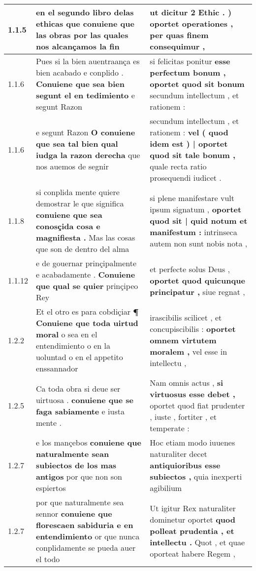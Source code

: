 \begin{tabular}{|p{1cm}|p{6.5cm}|p{6.5cm}|}

\hline
1.1.5 & en el segundo libro delas ethicas \textbf{ que conuiene que las obras } por las quales nos alcançamos la fin & ut dicitur 2 Ethic . ) \textbf{ oportet operationes , } per quas finem consequimur , \\\hline
1.1.6 & Pues si la bien auentraança es bien acabado e conplido . \textbf{ Conuiene que sea bien segunt el en tedimiento } e segunt Razon & si felicitas ponitur \textbf{ esse perfectum bonum , oportet quod sit bonum } secundum intellectum , et rationem : \\\hline
1.1.6 & e segunt Razon \textbf{ O conuiene que sea tal bien qual iudga la razon derecha } que nos auemos de segnir & secundum intellectum , et rationem : \textbf{ vel ( quod idem est ) | oportet quod sit tale bonum , } quale recta ratio prosequendi iudicet . \\\hline
1.1.8 & si conplida mente quiere demostrar le que significa \textbf{ conuiene que sea conosçida cosa e magnifiesta . } Mas las cosas que son de dentro del alma & si plene manifestare vult ipsum signatum , \textbf{ oportet quod sit | quid notum et manifestum : } intrinseca autem non sunt nobis nota , \\\hline
1.1.12 & e de gouernar prinçipalmente e acabadamente . \textbf{ Conuiene que qual se quier } prinçipeo Rey & et perfecte solus Deus , \textbf{ oportet quod quicunque principatur , } siue regnat , \\\hline
1.2.2 & Et el otro es para cobdiçiar \textbf{ ¶ Conuiene que toda uirtud moral } o sea en el entendimiento o en la uoluntad o en el appetito enssannador & irascibilis scilicet , et concupiscibilis : \textbf{ oportet omnem virtutem moralem , } vel esse in intellectu , \\\hline
1.2.5 & Ca toda obra si deue ser uirtuosa . \textbf{ conuiene que se faga sabiamente } e iusta mente . & Nam omnis actus , \textbf{ si virtuosus esse debet , } oportet quod fiat prudenter , iuste , fortiter , et temperate : \\\hline
1.2.7 & e los mançebos \textbf{ conuiene que naturalmente sean subiectos de los mas antigos } por que non son espiertos & Hoc etiam modo iuuenes naturaliter decet \textbf{ antiquioribus esse subiectos , } quia inexperti agibilium \\\hline
1.2.7 & por que naturalmente sea sennor \textbf{ conuiene que florescaen sabiduria e en entendimiento } or que nunca conplidamente se pueda auer el todo & Ut igitur Rex naturaliter dominetur oportet \textbf{ quod polleat prudentia , et intellectu . } Quot , et quae oporteat habere Regem , \\\hline

\end{tabular}
